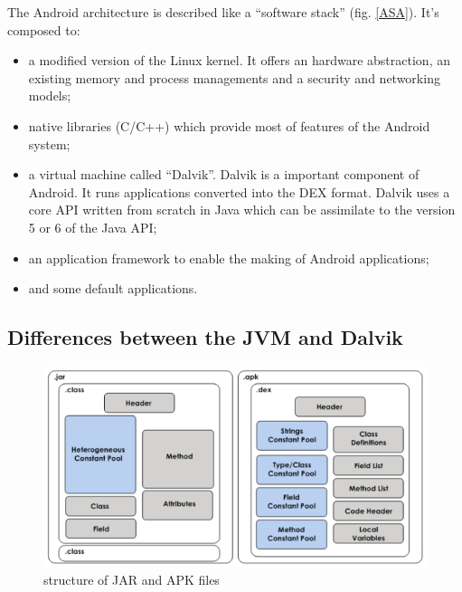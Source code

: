 \documentclass{sigplanconf}
\def \DALVIK{\mbox{Dalvik}\xspace}
\def \ANDROID{\mbox{Android}\xspace}
\def \DEX{\mbox{DEX}\xspace}
\begin{document}
    The \ANDROID architecture is described like a ``software stack'' (fig. \ref{ASA}).
    It's composed to:
    \begin{itemize}
      \item a modified version of the Linux kernel.
        It offers an hardware abstraction,
        an existing memory and process managements
        and a security and networking models;
      \item native libraries (C/C++)
        which provide most of features of the \ANDROID system;
      \item a virtual machine called ``\DALVIK''. \DALVIK is a important component of \ANDROID.
        It runs applications converted into the \DEX format.
        \DALVIK uses a core API written from scratch in Java
        which can be assimilate to the version 5 or 6 of the Java API;
      \item an application framework to enable the making of \ANDROID applications;
      \item and some default applications.
    \end{itemize}

    \subsection{Differences between the JVM and Dalvik}

      \begin{figure}[h]
        \centering
        \includegraphics[width=\columnwidth]{structure-jar-apk.png}
        \caption{structure of JAR and APK files}
        \label{SJA}
      \end{figure}
\end{document}
